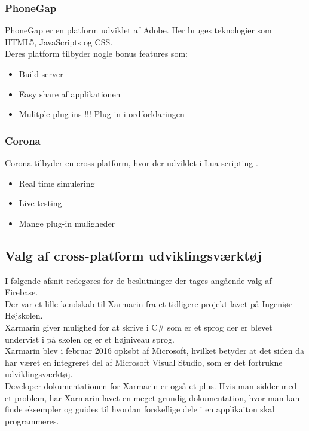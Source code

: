 \subsubsection{PhoneGap}
PhoneGap er en platform udviklet af Adobe\cite{Adobe}. Her bruges teknologier som HTML5\cite{HTML5}, JavaScripts\cite{JavaScript} og CSS\cite{CSS}. \\
Deres platform tilbyder nogle bonus features som:
\begin{itemize}[-]
	\item Build server
	\item Easy share af applikationen 
	\item Mulitple plug-ins !!! Plug in i ordforklaringen
\end{itemize}

\subsubsection{Corona}
Corona tilbyder en cross-platform, hvor der udviklet i Lua scripting \cite{Lua}.
\begin{itemize}[-]
	\item Real time simulering
	\item Live testing
	\item Mange plug-in muligheder
\end{itemize}

\clearpage

\subsection{Valg af cross-platform udviklingsværktøj}
I følgende afsnit redegøres for de beslutninger der tages angående valg af Firebase. \\

Der var et lille kendskab til Xarmarin fra et tidligere projekt lavet på Ingeniør Højskolen. \\
Xarmarin giver mulighed for at skrive i C\# som er et sprog der er blevet undervist i på skolen og er et højniveau sprog. \\
Xarmarin blev i februar 2016 opkøbt af Microsoft, hvilket betyder at det siden da har været en integreret del af Microsoft Visual Studio, som er det fortrukne udviklingsværktøj.\\
Developer dokumentationen for Xarmarin er også et plus. Hvis man sidder med et problem, har Xarmarin lavet en meget grundig dokumentation, hvor man kan finde eksempler og guides til hvordan forskellige dele i en applikaiton skal programmeres.

